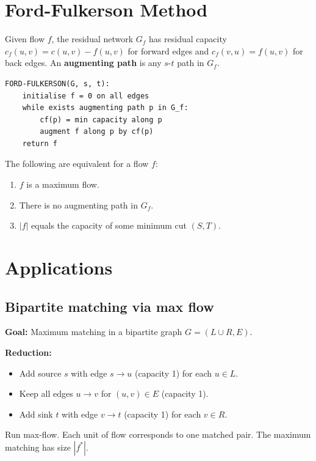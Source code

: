 \documentclass[11pt,a4paper,openany]{book}
\begin{document}
\section{Ford-Fulkerson Method}

\begin{defnbox}[title=Residual network]
Given flow $f$, the residual network $G_f$ has residual capacity
$c_f(u,v) = c(u,v) - f(u,v)$ for forward edges and $c_f(v,u) = f(u,v)$ for back edges.
An \textbf{augmenting path} is any $s$-$t$ path in $G_f$.
\end{defnbox}

\begin{lstlisting}
FORD-FULKERSON(G, s, t):
    initialise f = 0 on all edges
    while exists augmenting path p in G_f:
        cf(p) = min capacity along p
        augment f along p by cf(p)
    return f
\end{lstlisting}

\begin{thmbox}[title=Max-flow min-cut theorem]
The following are equivalent for a flow $f$:
\begin{enumerate}
  \item $f$ is a maximum flow.
  \item There is no augmenting path in $G_f$.
  \item $|f|$ equals the capacity of some minimum cut $(S, T)$.
\end{enumerate}
\end{thmbox}

\section{Applications}

\subsection{Bipartite matching via max flow}

\begin{thmbox}[title=Algorithm]
\textbf{Goal:} Maximum matching in a bipartite graph $G = (L \cup R, E)$.

\textbf{Reduction:}
\begin{itemize}
  \item Add source $s$ with edge $s \to u$ (capacity 1) for each $u \in L$.
  \item Keep all edges $u \to v$ for $(u,v) \in E$ (capacity 1).
  \item Add sink $t$ with edge $v \to t$ (capacity 1) for each $v \in R$.
\end{itemize}

Run max-flow. Each unit of flow corresponds to one matched pair.
The maximum matching has size $|f^*|$.
\end{thmbox}
\end{document}
